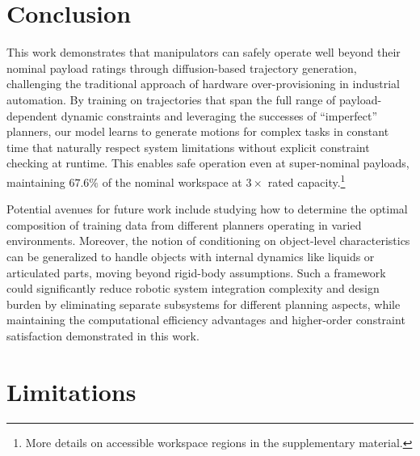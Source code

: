 \section{Conclusion}
\label{sec:payload:conclusion}

This work demonstrates that manipulators can safely operate well beyond their nominal payload ratings through diffusion-based trajectory generation, challenging the traditional approach of hardware over-provisioning in industrial automation.
By training on trajectories that span the full range of payload-dependent dynamic constraints and leveraging the successes of ``imperfect'' planners, our model learns to generate motions for complex tasks in constant time that naturally respect system limitations without explicit constraint checking at runtime. This enables safe operation even at super-nominal payloads, maintaining $67.6\%$ of the nominal workspace at $3\times$ rated capacity.\footnote{More details on accessible workspace regions in the supplementary material.}

Potential avenues for future work include studying how to determine the optimal composition of training data from different planners operating in varied environments.
Moreover, the notion of conditioning on object-level characteristics can be generalized to handle objects with internal dynamics like liquids or articulated parts, moving beyond rigid-body assumptions.
Such a framework could significantly reduce robotic system integration complexity and design burden by eliminating separate subsystems for different planning aspects, while maintaining the computational efficiency advantages and higher-order constraint satisfaction demonstrated in this work.

\section{Limitations}
\label{sec:payload:limitations}

